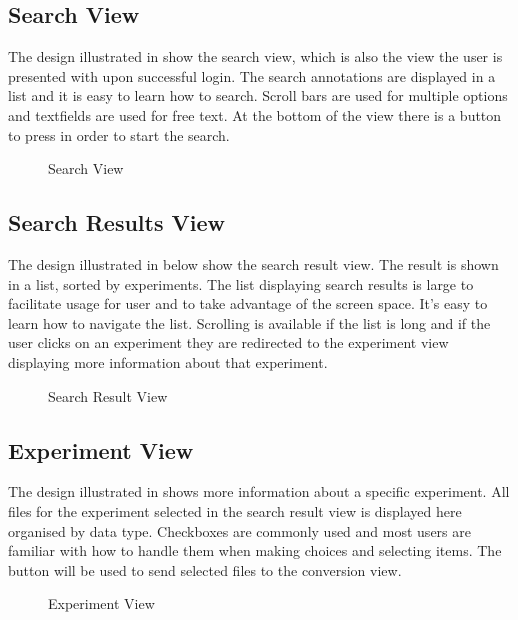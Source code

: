 \subsection{Search View}
The design illustrated in  show the search view, 
which is also the view the user is presented with upon successful login.
The search annotations are displayed in a list and it is easy to learn how to search.
Scroll bars are used for multiple options and textfields are used for free text. 
At the bottom of the view there is a button to press in order to start the search.

\begin{figure}[ht]
\caption{Search View}
\label{fig:and_search}
\end{figure}
\FloatBarrier

\subsection{Search Results View}
The design illustrated in  below show the search result view. 
The result is shown in a list, sorted by experiments. The list displaying search results is large to facilitate usage for user and to take advantage of the screen space. 
It's easy to learn how to navigate the list. 
Scrolling is available if the list is long and if the user clicks on an experiment they are redirected to the experiment view displaying more information about that experiment.

\begin{figure}[ht]
\caption{Search Result View}
\label{fig:and_result}
\end{figure}
\FloatBarrier

\subsection{Experiment View}
The design illustrated in  shows more information about a specific experiment. 
All files for the experiment selected in the search result view is displayed here organised by data type.
Checkboxes are commonly used and most users are familiar with how to handle them when making choices and selecting items.
The button  will be used to send selected files to the conversion view.

\begin{figure}[ht]
\caption{Experiment View}
\label{fig:and_experiment}
\end{figure}
\FloatBarrier

